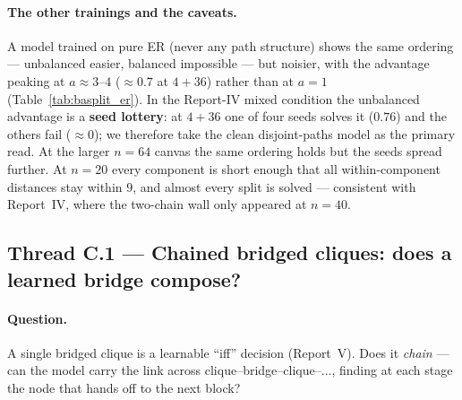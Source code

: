 \documentclass[11pt,a4paper]{article}
\begin{document}
\paragraph{The other trainings and the caveats.} A model trained on pure ER (never any path
structure) shows the same ordering --- unbalanced easier, balanced impossible --- but noisier, with the
advantage peaking at $a\approx3$--$4$ ($\approx0.7$ at $4{+}36$) rather than at $a=1$
(Table~\ref{tab:basplit_er}). In the
Report-IV mixed condition the unbalanced advantage is a \textbf{seed lottery}: at $4{+}36$ one of four
seeds solves it ($0.76$) and the others fail ($\approx0$); we therefore take the clean disjoint-paths
model as the primary read. At the larger $n=64$ canvas the same ordering holds but the seeds spread
further. At $n=20$ every component is short enough that all within-component distances stay within $9$,
and almost every split is solved --- consistent with Report~IV, where the two-chain wall only appeared
at $n=40$.

\subsection{Thread C.1 --- Chained bridged cliques: does a learned bridge compose?}
\label{sec:res-chain-cliques}
\paragraph{Question.} A single bridged clique is a learnable ``iff'' decision (Report~V). Does it
\emph{chain} --- can the model carry the link across clique--bridge--clique--$\dots$, finding at each
stage the node that hands off to the next block?
\end{document}
